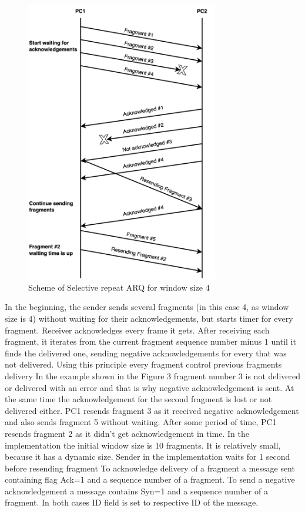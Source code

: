 \documentclass{article}
\begin{document}
\begin{figure}[!h]
    \centering
    \includegraphics[width=0.75\textwidth]{images/arq.png}
    \caption{Scheme of Selective repeat ARQ for window size 4}
    \label{fig:mesh1}
\end{figure}

In the beginning, the sender sends several fragments (in this case 4, as window size is 4) without waiting for their acknowledgements, but starts timer for every fragment.  Receiver acknowledges every frame it gets. After receiving each fragment, it iterates from the current fragment sequence number minus 1 until it finds the delivered one, sending negative acknowledgements for every that was not delivered. Using this principle every fragment control previous fragments delivery    In the example shown in the Figure 3 fragment number 3 is not delivered or delivered with an error and that is why negative acknowledgement is sent. At the same time the acknowledgement for the second fragment is lost or not delivered  either.  PC1 resends fragment 3 as it received negative acknowledgement and also sends fragment 5  without waiting. After some period of time, PC1 resends fragment 2 as it didn't get acknowledgement in time.\newline
In the implementation the initial window size is 10 fragments. It is relatively small, because it has a dynamic size. Sender in the implementation waits for 1 second before resending fragment \newline
To acknowledge delivery of a fragment a message sent containing flag Ack=1 and a sequence number of a fragment. To send a negative acknowledgement a message contains Syn=1 and a sequence number of a fragment. In both cases ID field is set to respective ID of the message.
\end{document}
